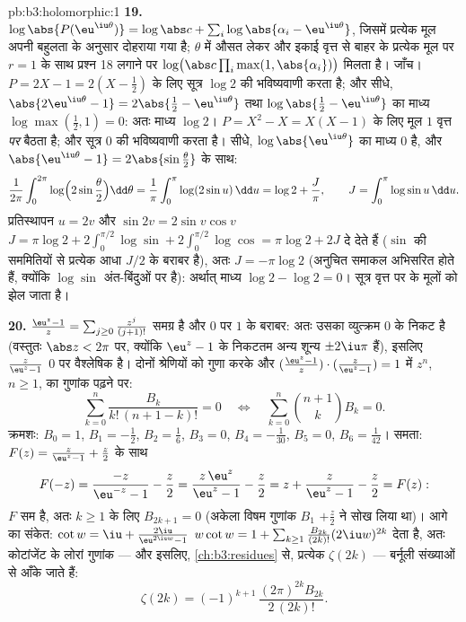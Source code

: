 \begin{solution}{pb:b3:holomorphic:1}
\textbf{19.} $\log\abs{P(\eu^{\iu\theta})} = \log\abs c +
\sum_i\log\abs{\alpha_i - \eu^{\iu\theta}}$, जिसमें प्रत्येक मूल अपनी बहुलता के अनुसार दोहराया
गया है; $\theta$ में औसत लेकर और इकाई वृत्त से बाहर के प्रत्येक मूल पर
$r = 1$ के साथ प्रश्न 18 लगाने पर $\log\bigl(\abs c\prod_i\max(1,
\abs{\alpha_i})\bigr)$ मिलता है। जाँच। $P = 2X - 1 = 2(X -
\frac12)$ के लिए
सूत्र $\log 2$ की भविष्यवाणी करता है; और सीधे, $\abs{2\eu^{\iu\theta} - 1} = 2\abs{\frac12 -
\eu^{\iu\theta}}$ तथा $\log\abs{\frac12 -
\eu^{\iu\theta}}$ का माध्य
$\log\max(\frac12, 1) = 0$: अतः माध्य $\log
2$। $P = X^2 - X = X(X - 1)$ के लिए मूल $1$ वृत्त \emph{पर} बैठता
है; और सूत्र $0$ की भविष्यवाणी करता है। सीधे, $\log\abs{\eu^{\iu\theta}}$ का माध्य $0$
है, और $\abs{\eu^{\iu\theta} - 1} = 2\abs{\sin\frac\theta2}$ के साथ:
\[
\frac1{2\pi}\int_0^{2\pi}
\log\Bigl(2\sin\frac\theta2\Bigr)\dd\theta
= \frac1\pi\int_0^\pi\log(2\sin u)\,\dd u
= \log 2 + \frac J\pi,
\qquad J = \int_0^\pi\log\sin u\,\dd u .
\]
प्रतिस्थापन $u = 2v$ और $\sin 2v = 2\sin v\cos v$ $J = \pi\log2 + 2\int_0^{\pi/2}\log\sin +
2\int_0^{\pi/2}\log\cos = \pi\log 2 + 2J$ दे देते हैं ($\sin$ की सममितियों से
प्रत्येक आधा $J/2$ के बराबर है), अतः $J = -\pi\log 2$ (अनुचित समाकल अभिसरित होते
हैं, क्योंकि $\log\sin$ अंत-बिंदुओं पर  है): अर्थात् माध्य $\log2 - \log2 = 0$।
सूत्र वृत्त पर के मूलों को झेल जाता है।

\textbf{20.} $\frac{\eu^z - 1}z =
\sum_{j\geq0}\frac{z^j}{(j+1)!}$ समग्र है और $0$ पर $1$ के बराबर: अतः उसका
व्युत्क्रम $0$ के निकट  है (वस्तुतः $\abs z <
2\pi$ पर, क्योंकि
$\eu^z - 1$ के निकटतम अन्य शून्य $\pm2\iu\pi$ हैं), इसलिए $\frac z{\eu^z-1}$ $0$ पर वैश्लेषिक
है। दोनों श्रेणियों को गुणा करके और $(\frac{\eu^z-1}z)\cdot(\frac
z{\eu^z-1}) = 1$ में $z^n$, $n \geq 1$, का गुणांक
पढ़ने पर:
\[
\sum_{k=0}^{n}\frac{B_k}{k!\,(n+1-k)!} = 0
\quad\Longleftrightarrow\quad
\sum_{k=0}^{n}\binom{n+1}{k}B_k = 0 .
\]
क्रमशः: $B_0 = 1$, $B_1 = -\frac12$, $B_2 = \frac16$, $B_3 = 0$, $B_4 = -\frac1{30}$, $B_5 = 0$, $B_6 =
\frac1{42}$। समता: $F(z) = \frac z{\eu^z-1} +
\frac z2$
के साथ
\[
F(-z) = \frac{-z}{\eu^{-z} - 1} - \frac z2
= \frac{z\,\eu^z}{\eu^z - 1} - \frac z2
= z + \frac{z}{\eu^z - 1} - \frac z2 = F(z) :
\]
$F$ सम है, अतः $k \geq 1$ के लिए $B_{2k+1} = 0$ (अकेला विषम गुणांक $B_1$ $+\frac z2$
ने सोख लिया था)। आगे का संकेत: $\cot w = \iu + \frac{2\iu}{\eu^{2\iu w}-1}$ $w\cot w = 1 + \sum_{k\geq1}\frac{B_{2k}}{(2k)!}(2\iu
w)^{2k}$ देता है, अतः कोटांजेंट
के लोरां गुणांक --- और इसलिए, \cref{ch:b3:residues} से, प्रत्येक $\zeta(2k)$ --- बर्नूली
संख्याओं से आँके जाते हैं:
\[
\zeta(2k) = (-1)^{k+1}\,\frac{(2\pi)^{2k}B_{2k}}{2\,(2k)!} .
\]


\end{solution}
